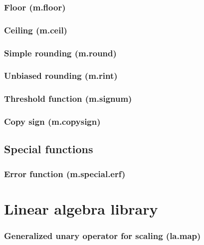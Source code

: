 \documentclass{article}
\theoremstyle{definition}
\begin{document}
\subsubsection{Floor (m.floor)}

\subsubsection{Ceiling (m.ceil)}

\subsubsection{Simple rounding (m.round)}

\subsubsection{Unbiased rounding (m.rint)}

\subsubsection{Threshold function (m.signum)}

\subsubsection{Copy sign (m.copysign)}

\subsection{Special functions}

\subsubsection{Error function (m.special.erf)}

\pagebreak

\section{Linear algebra library}

\subsubsection{Generalized unary operator for scaling (la.map)}
\end{document}
